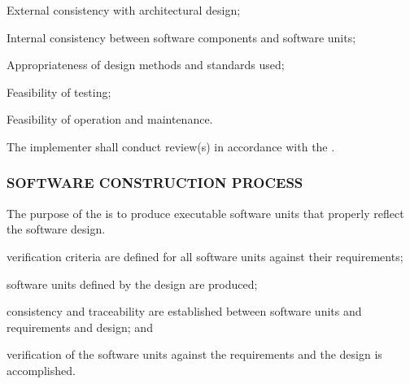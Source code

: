\begin{adjustwidth}{2em}{0pt}
\begin{compactenum}
\begin{compactenum}
\begin{compactenum}
							\item External consistency with architectural design;

							\item Internal consistency between software components and software units;

							\item Appropriateness of design methods and standards used;

							\item Feasibility of testing;

							\item Feasibility of operation and maintenance.

						\end{compactenum}

						\item The implementer shall conduct review(s) in accordance with the .

					\end{compactenum}

				\end{compactenum}

			\end{adjustwidth}

		\newpage
		\subsubsection{SOFTWARE CONSTRUCTION PROCESS\label{proc:software_construction_process}}

			\begin{adjustwidth}{2em}{0pt} 
				
				The purpose of the  is to produce executable software units that properly reflect the software design.

			\end{adjustwidth}

			\begin{adjustwidth}{2em}{0pt} 

				\begin{compactitem}

					\item verification criteria are defined for all software units against their requirements;

					\item software units defined by the design are produced;

					\item consistency and traceability are established between software units and requirements and design; and

					\item verification of the software units against the requirements and the design is accomplished.

				\end{compactitem}

			\end{adjustwidth}

